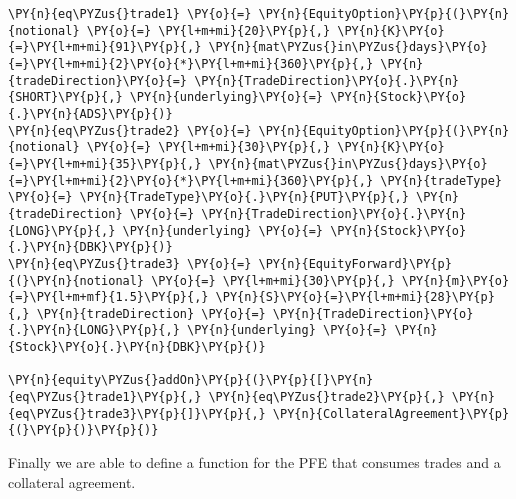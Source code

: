     \begin{tcolorbox}[breakable, size=fbox, boxrule=1pt, pad at break*=1mm,colback=cellbackground, colframe=cellborder]
\begin{Verbatim}[commandchars=\\\{\}]
\PY{n}{eq\PYZus{}trade1} \PY{o}{=} \PY{n}{EquityOption}\PY{p}{(}\PY{n}{notional} \PY{o}{=} \PY{l+m+mi}{20}\PY{p}{,} \PY{n}{K}\PY{o}{=}\PY{l+m+mi}{91}\PY{p}{,} \PY{n}{mat\PYZus{}in\PYZus{}days}\PY{o}{=}\PY{l+m+mi}{2}\PY{o}{*}\PY{l+m+mi}{360}\PY{p}{,} \PY{n}{tradeDirection}\PY{o}{=} \PY{n}{TradeDirection}\PY{o}{.}\PY{n}{SHORT}\PY{p}{,} \PY{n}{underlying}\PY{o}{=} \PY{n}{Stock}\PY{o}{.}\PY{n}{ADS}\PY{p}{)}
\PY{n}{eq\PYZus{}trade2} \PY{o}{=} \PY{n}{EquityOption}\PY{p}{(}\PY{n}{notional} \PY{o}{=} \PY{l+m+mi}{30}\PY{p}{,} \PY{n}{K}\PY{o}{=}\PY{l+m+mi}{35}\PY{p}{,} \PY{n}{mat\PYZus{}in\PYZus{}days}\PY{o}{=}\PY{l+m+mi}{2}\PY{o}{*}\PY{l+m+mi}{360}\PY{p}{,} \PY{n}{tradeType} \PY{o}{=} \PY{n}{TradeType}\PY{o}{.}\PY{n}{PUT}\PY{p}{,} \PY{n}{tradeDirection} \PY{o}{=} \PY{n}{TradeDirection}\PY{o}{.}\PY{n}{LONG}\PY{p}{,} \PY{n}{underlying} \PY{o}{=} \PY{n}{Stock}\PY{o}{.}\PY{n}{DBK}\PY{p}{)}
\PY{n}{eq\PYZus{}trade3} \PY{o}{=} \PY{n}{EquityForward}\PY{p}{(}\PY{n}{notional} \PY{o}{=} \PY{l+m+mi}{30}\PY{p}{,} \PY{n}{m}\PY{o}{=}\PY{l+m+mf}{1.5}\PY{p}{,} \PY{n}{S}\PY{o}{=}\PY{l+m+mi}{28}\PY{p}{,} \PY{n}{tradeDirection} \PY{o}{=} \PY{n}{TradeDirection}\PY{o}{.}\PY{n}{LONG}\PY{p}{,} \PY{n}{underlying} \PY{o}{=} \PY{n}{Stock}\PY{o}{.}\PY{n}{DBK}\PY{p}{)}

\PY{n}{equity\PYZus{}addOn}\PY{p}{(}\PY{p}{[}\PY{n}{eq\PYZus{}trade1}\PY{p}{,} \PY{n}{eq\PYZus{}trade2}\PY{p}{,} \PY{n}{eq\PYZus{}trade3}\PY{p}{]}\PY{p}{,} \PY{n}{CollateralAgreement}\PY{p}{(}\PY{p}{)}\PY{p}{)}
\end{Verbatim}
\end{tcolorbox}

    Finally we are able to define a function for the PFE that consumes
trades and a collateral agreement.

